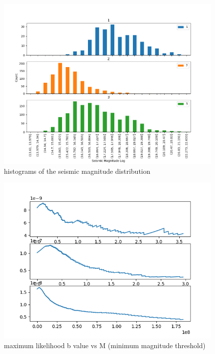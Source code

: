 \documentclass{article}
\begin{document}
    \begin{figure}[H]        
        \centering
        \includegraphics*[width = \textwidth, height = \textheight, keepaspectratio]{logSeismicHistogram.png}
        \caption{histograms of the seismic magnitude distribution}
    \end{figure}

    \begin{figure}[H]        
        \centering
        \includegraphics*[width = \textwidth, height = \textheight, keepaspectratio]{bVsoffset.png}
        \caption{maximum likelihood b value vs M (minimum magnitude threshold)}
    \end{figure}
\end{document}
